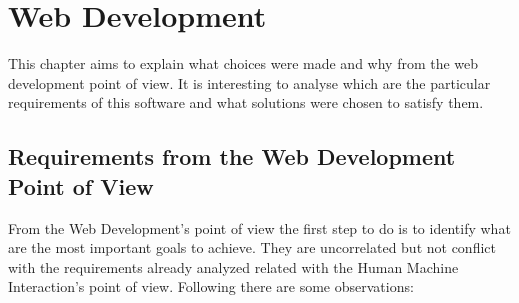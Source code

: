 
\chapter{Web Development} %

\label{Chapter 9} %


This chapter aims to explain what choices were made and why from the web development point of view. It is interesting to analyse which are the particular requirements of this software and what solutions were chosen to satisfy them. 

\section{Requirements from the Web Development Point of View}

From the Web Development's point of view the first step to do is to identify what are the most important goals to achieve. They are uncorrelated but not conflict with the requirements already analyzed related with the Human Machine Interaction's point of view. Following there are some observations:

